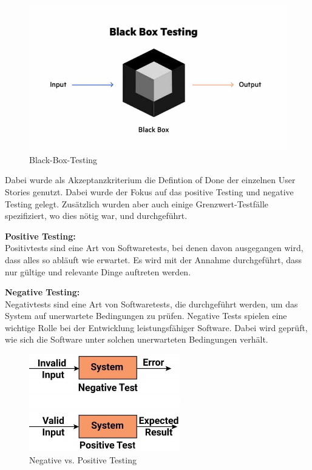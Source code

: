 \begin{figure}[!htb]
  \centering
  \includegraphics[width=.9\textwidth]{figures/rebecca/Black_Box_Testing.jpg}
  \caption[]{Black-Box-Testing}
  \label{fig:BlackBoxTest}
\end{figure}

Dabei wurde als Akzeptanzkriterium die Defintion of Done der einzelnen User Stories genutzt. Dabei wurde der Fokus auf das positive Testing und negative Testing gelegt. Zusätzlich wurden aber auch einige Grenzwert-Testfälle spezifiziert, wo dies nötig war, und durchgeführt.

\textbf{Positive Testing:} \\
Positivtests sind eine Art von Softwaretests, bei denen davon ausgegangen wird, dass alles so abläuft wie erwartet. Es wird mit der Annahme durchgeführt, dass nur gültige und relevante Dinge auftreten werden.

\textbf{Negative Testing:} \\
Negativtests sind eine Art von Softwaretests, die durchgeführt werden, um das System auf unerwartete Bedingungen zu prüfen. Negative Tests spielen eine wichtige Rolle bei der Entwicklung leistungsfähiger Software. Dabei wird geprüft, wie sich die Software unter solchen unerwarteten Bedingungen verhält.

\begin{figure}[!htb]
  \centering
  \includegraphics[width=.9\textwidth]{figures/rebecca/Neg_Pos_Testing.png}
  \caption[]{Negative vs. Positive Testing}
  \label{fig:negativ_vs_positiv_testing}
\end{figure}

